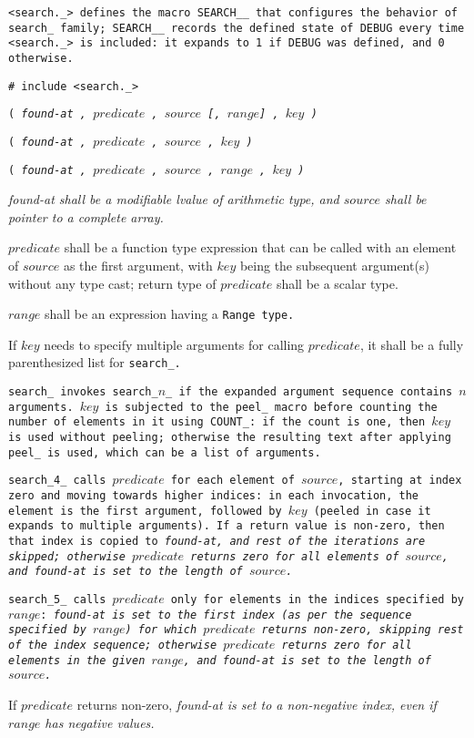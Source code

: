 \tt{<search._>} defines the macro \tt{SEARCH__} that configures the
behavior of \tt{search_} family;  \tt{SEARCH__} records the \tt{defined}
state of \tt{DEBUG} every time \tt{<search._>} is included:
it expands to \tt{1} if \tt{DEBUG} was defined, and \tt{0} otherwise.


\tt{# include <search._>}

\s\s\s\tt{(} \it{found-at} \tt{,}
$predicate$ \tt{,} $source$ [\tt{,} $range$] \tt{,} $key$ \tt{)}

\s\tt{(} \it{found-at} \tt{,}
$predicate$ \tt{,} $source$ \phantom{[}\tt{,} $key$\phantom{]} \tt{)}

\s\tt{(} \it{found-at} \tt{,}
$predicate$ \tt{,} $source$ \phantom{[}\tt{,} $range$\phantom{]} \tt{,} $key$ \tt{)}


\it{found-at} shall be a modifiable lvalue of arithmetic type,
and $source$ shall be pointer to a complete array.

$predicate$ shall be a function type expression that can be called with an element
of $source$ as the first argument, with $key$ being the subsequent argument(s)
without any type cast; return type of $predicate$ shall be a scalar type.

$range$ shall be an expression having a \tt{Range} type.

If $key$ needs to specify multiple arguments for calling $predicate$,
it shall be a fully parenthesized list for \tt{search_}.


\tt{search_} invokes \tt{search_}$n$\_ if the
expanded argument sequence contains $n$ arguments.
$key$ is subjected to the \tt{peel_} macro before counting the
number of elements in it using \tt{COUNT_}: if the count is one,
then $key$ is used without peeling; otherwise the resulting text
after applying \tt{peel_} is used, which can be a list of arguments.

\tt{search_4_} calls $predicate$ for each element of $source$,
starting at index zero and moving towards higher indices:
in each invocation, the element is the first argument, followed
by $key$ (peeled in case it expands to multiple arguments).
If a return value is non-zero, then that index is copied to \it{found-at},
and rest of the iterations are skipped; otherwise $predicate$ returns zero for
all elements of $source$, and \it{found-at} is set to the length of $source$.

\tt{search_5_} calls $predicate$ only for elements in the indices specified
by $range$: \it{found-at} is set to the first index (as per the sequence
specified by $range$) for which $predicate$ returns non-zero, skipping rest
of the index sequence; otherwise $predicate$ returns zero for all elements
in the given $range$, and \it{found-at} is set to the length of $source$.

\note If $predicate$ returns non-zero, \it{found-at} is set
to a non-negative index, even if $range$ has negative values.
